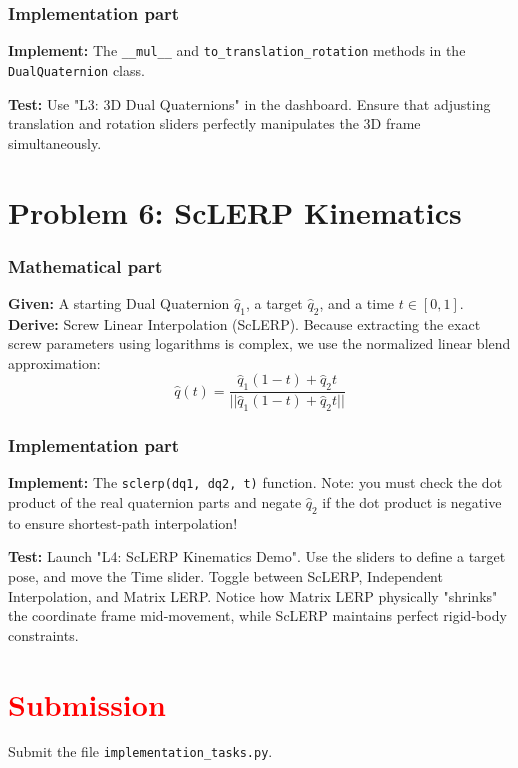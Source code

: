 \documentclass[11pt]{article}
\begin{document}
\subsubsection*{Implementation part}
\textbf{Implement:} The \lstinline|__mul__| and \lstinline|to_translation_rotation| methods in the \lstinline|DualQuaternion| class.

\textbf{Test:} Use "L3: 3D Dual Quaternions" in the dashboard. Ensure that adjusting translation and rotation sliders perfectly manipulates the 3D frame simultaneously.

\section*{Problem 6: ScLERP Kinematics}

\subsubsection*{Mathematical part}
\textbf{Given:} A starting Dual Quaternion $\hat{q}_1$, a target $\hat{q}_2$, and a time $t \in [0, 1]$.\\
\textbf{Derive:} Screw Linear Interpolation (ScLERP). Because extracting the exact screw parameters using logarithms is complex, we use the normalized linear blend approximation:
$$ \hat{q}(t) = \frac{\hat{q}_1(1-t) + \hat{q}_2t}{||\hat{q}_1(1-t) + \hat{q}_2t||} $$

\subsubsection*{Implementation part}
\textbf{Implement:} The \lstinline|sclerp(dq1, dq2, t)| function. Note: you must check the dot product of the real quaternion parts and negate $\hat{q}_2$ if the dot product is negative to ensure shortest-path interpolation!

\textbf{Test:} Launch "L4: ScLERP Kinematics Demo". Use the sliders to define a target pose, and move the Time slider. Toggle between ScLERP, Independent Interpolation, and Matrix LERP. Notice how Matrix LERP physically "shrinks" the coordinate frame mid-movement, while ScLERP maintains perfect rigid-body constraints.

\section*{\textcolor{red}{Submission}}
Submit the file \texttt{implementation\_tasks.py}.
\end{document}
